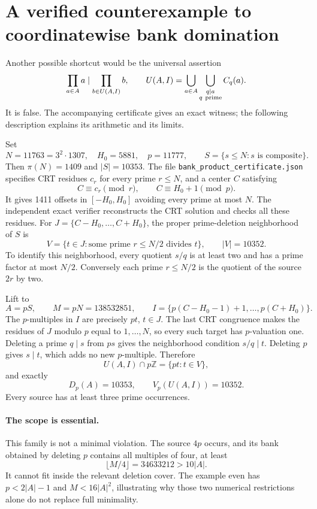 \documentclass[11pt,a4paper]{article}
\theoremstyle{remark}
\begin{document}
\section{A verified counterexample to coordinatewise bank domination}

Another possible shortcut would be the universal assertion
\begin{equation}
 \prod_{a\in A}a\mid\prod_{b\in U(A,I)}b,
 \qquad
 U(A,I)=\bigcup_{a\in A}
       \bigcup_{\substack{q\mid a\\q\ {\rm prime}}}C_q(a).
 \label{eq:false-bank}
\end{equation}
It is false. The accompanying certificate gives an exact witness;
the following description explains its arithmetic and its limits.

Set
\[
 N=11763=3^2\cdot1307,\quad H_0=5881,\quad p=11777,
 \qquad S=\{s\le N:s\text{ is composite}\}.
\]
Then \(\pi(N)=1409\) and \(|S|=10353\). The file
\nolinkurl{bank_product_certificate.json} specifies CRT residues
\(c_r\) for every prime \(r\le N\), and a center \(C\) satisfying
\[
 C\equiv c_r\pmod r,\qquad C\equiv H_0+1\pmod p.
\]
It gives 1411 offsets in \([-H_0,H_0]\) avoiding every prime
at most \(N\). The independent exact verifier reconstructs
the CRT solution and checks all these residues. For
\(J=\{C-H_0,\ldots,C+H_0\}\), the proper prime-deletion
neighborhood of \(S\) is
\[
 V=\{t\in J:\text{some prime }r\le N/2\text{ divides }t\},
 \qquad |V|=10352.
\]
To identify this neighborhood, every quotient \(s/q\) is at
least two and has a prime factor at most \(N/2\). Conversely
each prime \(r\le N/2\) is the quotient of the source \(2r\)
by two.

Lift to
\[
 A=pS,\qquad M=pN=138532851,\qquad
 I=\{p(C-H_0-1)+1,\ldots,p(C+H_0)\}.
\]
The \(p\)-multiples in \(I\) are precisely \(pt\), \(t\in J\).
The last CRT congruence makes the residues of \(J\) modulo \(p\)
equal to \(1,\ldots,N\), so every such target has \(p\)-valuation
one. Deleting a prime \(q\mid s\) from \(ps\) gives the
neighborhood condition \(s/q\mid t\). Deleting \(p\) gives
\(s\mid t\), which adds no new \(p\)-multiple. Therefore
\[
 U(A,I)\cap p\mathbb Z=\{pt:t\in V\},
\]
and exactly
\begin{equation}
 D_p(A)=10353,\qquad V_p(U(A,I))=10352.
 \label{eq:counter}
\end{equation}
Every source has at least three prime occurrences.

\paragraph{The scope is essential.}
This family is not a minimal violation. The source \(4p\) occurs,
and its bank obtained by deleting \(p\) contains all multiples
of four, at least
\[
 \lfloor M/4\rfloor=34633212>10|A|.
 \]
It cannot fit inside the relevant deletion cover. The example
even has \(p<2|A|-1\) and \(M<16|A|^2\), illustrating why those
two numerical restrictions alone do not replace full minimality.
\end{document}
